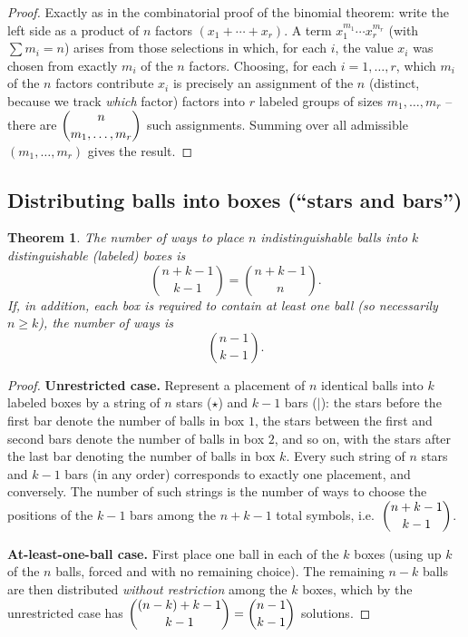\documentclass[11pt]{article}
\theoremstyle{definition}
\theoremstyle{plain}
\newtheorem{theorem}[definition]{Theorem}
\theoremstyle{remark}
\begin{document}
\begin{proof}
Exactly as in the combinatorial proof of the binomial theorem: write the left side as a product
of $n$ factors $(x_1+\cdots+x_r)$. A term $x_1^{m_1}\cdots x_r^{m_r}$ (with $\sum m_i = n$) arises
from those selections in which, for each $i$, the value $x_i$ was chosen from exactly $m_i$ of the
$n$ factors. Choosing, for each $i=1,\dots,r$, which $m_i$ of the $n$ factors contribute $x_i$ is
precisely an assignment of the $n$ (distinct, because we track \emph{which} factor) factors into
$r$ labeled groups of sizes $m_1,\dots,m_r$ -- there are $\dbinom{n}{m_1,\dots,m_r}$ such
assignments. Summing over all admissible $(m_1,\dots,m_r)$ gives the result.
\end{proof}

\subsection{Distributing balls into boxes (``stars and bars'')}

\begin{theorem}
\label{thm:stars-bars}
The number of ways to place $n$ indistinguishable balls into $k$ distinguishable (labeled) boxes
is
\[
\binom{n+k-1}{k-1} = \binom{n+k-1}{n}.
\]
If, in addition, each box is required to contain \emph{at least one} ball (so necessarily
$n \ge k$), the number of ways is
\[
\binom{n-1}{k-1}.
\]
\end{theorem}

\begin{proof}
\textbf{Unrestricted case.} Represent a placement of $n$ identical balls into $k$ labeled boxes
by a string of $n$ stars ($\star$) and $k-1$ bars ($|$): the stars before the first bar denote the
number of balls in box $1$, the stars between the first and second bars denote the number of
balls in box $2$, and so on, with the stars after the last bar denoting the number of balls in box
$k$. Every such string of $n$ stars and $k-1$ bars (in any order) corresponds to exactly one
placement, and conversely. The number of such strings is the number of ways to choose the
positions of the $k-1$ bars among the $n+k-1$ total symbols, i.e.\ $\dbinom{n+k-1}{k-1}$.

\textbf{At-least-one-ball case.} First place one ball in each of the $k$ boxes (using up $k$ of
the $n$ balls, forced and with no remaining choice). The remaining $n-k$ balls are then
distributed \emph{without restriction} among the $k$ boxes, which by the unrestricted case has
$\dbinom{(n-k)+k-1}{k-1} = \dbinom{n-1}{k-1}$ solutions.
\end{proof}
\end{document}
